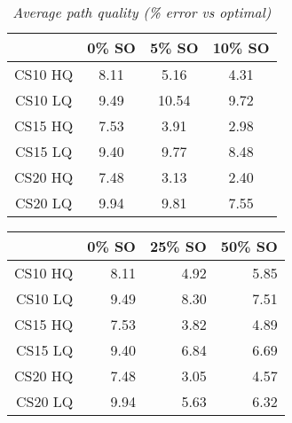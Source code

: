 \begin{table}[ht]
\begin{center}
\caption{\small{\emph{Average path quality (\% error vs optimal)}}}
\label{aha-table:pathquality}
\begin{tabular*}{0.4\textwidth}{@{\extracolsep{\fill}}cccc}%
  \hline
 & \small{0\% SO} & \small{5\% SO} & \small{10\% SO} \\
  \hline
 \small{CS10 HQ} & \small{8.11} & \small{5.16}  & \small{4.31} \\
 \small{CS10 LQ} & \small{9.49} & \small{10.54} & \small{9.72} \\
 \small{CS15 HQ} & \small{7.53} & \small{3.91}  & \small{2.98} \\
 \small{CS15 LQ} & \small{9.40} & \small{9.77}  & \small{8.48} \\
 \small{CS20 HQ} & \small{7.48} & \small{3.13}  & \small{2.40} \\
 \small{CS20 LQ} & \small{9.94} & \small{9.81}  & \small{7.55} \\
   \hline
\end{tabular*}
\end{center}
\end{table}

\begin{table}[ht]
\begin{center}
\begin{tabular}{rrrr}
  \hline
 & 0\% SO & 25\% SO & 50\% SO \\
  \hline
CS10 HQ & 8.11 & 4.92 & 5.85 \\
  CS10 LQ & 9.49 & 8.30 & 7.51 \\
  CS15 HQ & 7.53 & 3.82 & 4.89 \\
  CS15 LQ & 9.40 & 6.84 & 6.69 \\
  CS20 HQ & 7.48 & 3.05 & 4.57 \\
  CS20 LQ & 9.94 & 5.63 & 6.32 \\
   \hline
\end{tabular}
\end{center}
\end{table}

